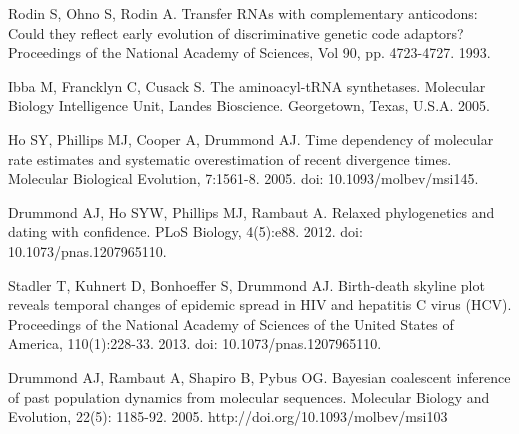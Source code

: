 \documentclass[10pt,letterpaper]{article}
\begin{document}
\begin{thebibliography}{10}
Rodin S, Ohno S, Rodin A.
\newblock Transfer RNAs with complementary anticodons: Could they reflect early evolution of discriminative genetic code adaptors?
\newblock Proceedings of the National Academy of Sciences, Vol 90, pp. 4723-4727. 1993.

Ibba M, Francklyn C, Cusack S.
\newblock The aminoacyl-tRNA synthetases.
\newblock Molecular Biology Intelligence Unit, Landes Bioscience. Georgetown, Texas, U.S.A. 2005.

Ho SY, Phillips MJ, Cooper A, Drummond AJ.
\newblock Time dependency of molecular rate estimates and systematic overestimation of recent divergence times.
\newblock Molecular Biological Evolution, 7:1561-8. 2005. doi: 10.1093/molbev/msi145.

Drummond AJ, Ho SYW, Phillips MJ, Rambaut A.
\newblock Relaxed phylogenetics and dating with confidence.
\newblock PLoS Biology, 4(5):e88. 2012. doi: 10.1073/pnas.1207965110.

Stadler T, Kuhnert D, Bonhoeffer S, Drummond AJ.
\newblock Birth-death skyline plot reveals temporal changes of epidemic spread in HIV and hepatitis C virus (HCV).
\newblock Proceedings of the National Academy of Sciences of the United States of America, 110(1):228-33. 2013. doi: 10.1073/pnas.1207965110.

Drummond AJ, Rambaut A, Shapiro B, Pybus OG.
\newblock Bayesian coalescent inference of past population dynamics from molecular sequences.
\newblock Molecular Biology and Evolution, 22(5): 1185-92. 2005. http://doi.org/10.1093/molbev/msi103

\end{thebibliography}
\end{document}
